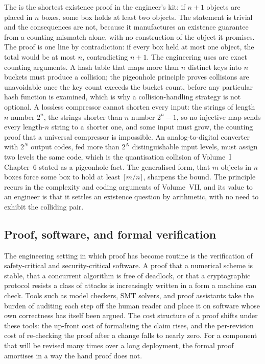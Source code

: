 \begin{mastery}
The  is the shortest existence proof in the
engineer's kit: if $n + 1$ objects are placed in $n$ boxes, some box
holds at least two objects. The statement is trivial and the
consequences are not, because it manufactures an existence guarantee from
a counting mismatch alone, with no construction of the object it
promises. The proof is one line by contradiction: if every box held at
most one object, the total would be at most $n$, contradicting $n + 1$.
The engineering uses are exact counting arguments. A hash table that maps
more than $n$ distinct keys into $n$ buckets must produce a collision;
the pigeonhole principle proves collisions are unavoidable once the key
count exceeds the bucket count, before any particular hash function is
examined, which is why a collision-handling strategy is not optional. A
lossless compressor cannot shorten every input: the strings of length
$n$ number $2^{n}$, the strings shorter than $n$ number $2^{n} - 1$, so
no injective map sends every length-$n$ string to a shorter one, and some
input must grow, the counting proof that a universal compressor is
impossible. An analog-to-digital converter with $2^{N}$ output codes,
fed more than $2^{N}$ distinguishable input levels, must assign two
levels the same code, which is the quantisation collision of Volume~I
Chapter~6 stated as a pigeonhole fact. The generalised form, that $m$
objects in $n$ boxes force some box to hold at least $\lceil m/n \rceil$,
sharpens the bound. The principle recurs in the complexity and coding
arguments of Volume~VII, and its value to an engineer is that it settles
an existence question by arithmetic, with no need to exhibit the colliding
pair.
\end{mastery}

\subsection{Proof, software, and formal verification}

The engineering setting in which proof has become routine is the
verification of safety-critical and security-critical software. A
proof that a numerical scheme is stable, that a concurrent algorithm
is free of deadlock, or that a cryptographic protocol resists a class
of attacks is increasingly written in a form a machine can check.
Tools such as model checkers, SMT solvers, and proof assistants take
the burden of auditing each step off the human reader and place it on
software whose own correctness has itself been argued. The cost
structure of a proof shifts under these tools: the up-front cost of
formalising the claim rises, and the per-revision cost of re-checking
the proof after a change falls to nearly zero. For a component that
will be revised many times over a long deployment, the formal proof
amortises in a way the hand proof does not.

